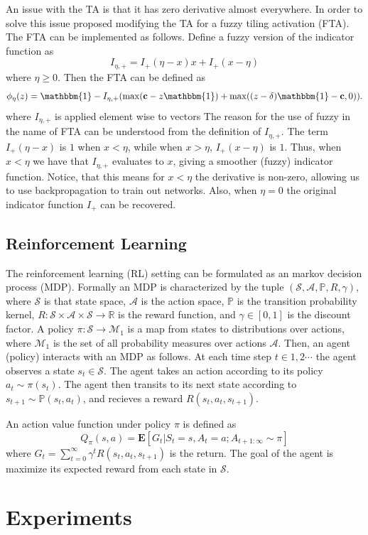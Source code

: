 \documentclass{article}
\newcommand{\RR}{\mathbb{R}}
\newcommand{\PP}{\mathbb{P}}
\newcommand{\cS}{\mathcal{S}}
\newcommand{\cA}{\mathcal{A}}
\newcommand{\cM}{\mathcal{M}}
\begin{document}
An issue with the TA is that it has zero derivative almost everywhere.
In order to solve this issue \cite{pan2019fuzzy} proposed modifying the TA for a fuzzy tiling activation (FTA).
The FTA can be implemented as follows.
Define a fuzzy version of the indicator function as 
$$I_{\eta, +} = I_+(\eta -x)x + I_+(x - \eta)$$
where $\eta \ge 0$.
Then the FTA can be defined as
$$\phi_\eta(z) = \mathbbm{1} - I_{\eta, +} (\max(\mathbf{c} - z \mathbbm{1}) + \max((z-\delta)\mathbbm{1} - \mathbf{c}, 0)).$$
where $I_{\eta, +}$ is applied element wise to vectors
The reason for the use of fuzzy in the name of FTA can be understood from the definition of $I_{\eta, +}$.
The term $I_+(\eta -x)$ is $1$ when $x < \eta$, while when $x > \eta$, $I_+(x - \eta)$ is $1$.
Thus, when $x < \eta$ we have that $I_{\eta ,+}$ evaluates to $x$, giving a smoother (fuzzy) indicator function.
Notice, that this means for $x < \eta$ the derivative is non-zero, allowing us to use backpropagation to train out networks.
Also, when $\eta = 0$ the original indicator function $I_+$ can be recovered.

\subsection{Reinforcement Learning}
The reinforcement learning (RL) setting can be formulated as an markov decision process (MDP).
Formally an MDP is characterized by the tuple $(\cS, \cA, \PP, R, \gamma)$, where $\cS$ is that state space, $\cA$ is the action space,
$\PP$ is the transition probability kernel, $R: \cS \times \cA \times \cS \to \RR$ is the reward function, and $\gamma \in [0, 1]$ is the discount factor.
A policy $\pi: \cS \to \cM_1$ is a map from states to distributions over actions, where $\cM_1$ is the set of all probability measures over actions $\cA$.
Then, an agent (policy) interacts with an MDP as follows.
At each time step $t \in 1, 2 \cdots$ the agent observes a state $s_t \in \cS$.
The agent takes an action according to its policy $a_t \sim \pi(s_t)$.
The agent then transits to its next state according to $s_{t+1} \sim \PP(s_t, a_t)$, and recieves a reward $R(s_t, a_t, s_{t+1})$.

An action value function under policy $\pi$ is defined as 
$$Q_\pi(s, a) = \mathbf{E}[G_t|S_t =s, A_t=a; A_{t+1: \infty} \sim \pi]$$
where $G_t = \sum_{t=0}^\infty \gamma^t R(s_t, a_t, s_{t+1})$ is the return.
The goal of the agent is maximize its expected reward from each state in $\cS$.


\section{Experiments} \label{sec:experiments}
\end{document}
